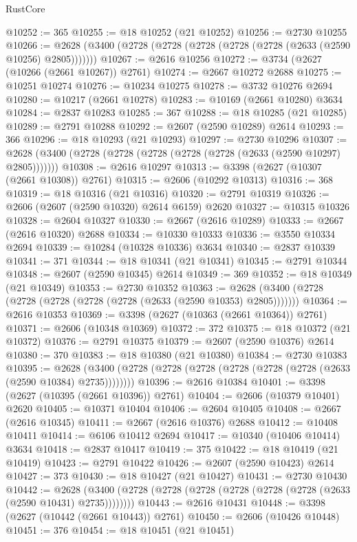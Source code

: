 \begin{lexlean}{RustCore}
\begin{coremodule}
@10252 := 365
@10255 := @18 @10252 (@21 @10252)
@10256 := @2730 @10255
@10266 := @2628 (@3400 (@2728 (@2728 (@2728 (@2728 (@2728 (@2633 (@2590 @10256) @2805)))))))
@10267 := @2616 @10256
@10272 := @3734 (@2627 (@10266 (@2661 @10267)) @2761)
@10274 := @2667 @10272 @2688
@10275 := @10251 @10274
@10276 := @10234 @10275
@10278 := @3732 @10276 @2694
@10280 := @10217 (@2661 @10278)
@10283 := @10169 (@2661 @10280) @3634
@10284 := @2837 @10283
@10285 := 367
@10288 := @18 @10285 (@21 @10285)
@10289 := @2791 @10288
@10292 := @2607 (@2590 @10289) @2614
@10293 := 366
@10296 := @18 @10293 (@21 @10293)
@10297 := @2730 @10296
@10307 := @2628 (@3400 (@2728 (@2728 (@2728 (@2728 (@2728 (@2633 (@2590 @10297) @2805)))))))
@10308 := @2616 @10297
@10313 := @3398 (@2627 (@10307 (@2661 @10308)) @2761)
@10315 := @2606 (@10292 @10313)
@10316 := 368
@10319 := @18 @10316 (@21 @10316)
@10320 := @2791 @10319
@10326 := @2606 (@2607 (@2590 @10320) @2614 @6159) @2620
@10327 := @10315 @10326
@10328 := @2604 @10327
@10330 := @2667 (@2616 @10289)
@10333 := @2667 (@2616 @10320) @2688
@10334 := @10330 @10333
@10336 := @3550 @10334 @2694
@10339 := @10284 (@10328 @10336) @3634
@10340 := @2837 @10339
@10341 := 371
@10344 := @18 @10341 (@21 @10341)
@10345 := @2791 @10344
@10348 := @2607 (@2590 @10345) @2614
@10349 := 369
@10352 := @18 @10349 (@21 @10349)
@10353 := @2730 @10352
@10363 := @2628 (@3400 (@2728 (@2728 (@2728 (@2728 (@2728 (@2633 (@2590 @10353) @2805)))))))
@10364 := @2616 @10353
@10369 := @3398 (@2627 (@10363 (@2661 @10364)) @2761)
@10371 := @2606 (@10348 @10369)
@10372 := 372
@10375 := @18 @10372 (@21 @10372)
@10376 := @2791 @10375
@10379 := @2607 (@2590 @10376) @2614
@10380 := 370
@10383 := @18 @10380 (@21 @10380)
@10384 := @2730 @10383
@10395 := @2628 (@3400 (@2728 (@2728 (@2728 (@2728 (@2728 (@2728 (@2633 (@2590 @10384) @2735))))))))
@10396 := @2616 @10384
@10401 := @3398 (@2627 (@10395 (@2661 @10396)) @2761)
@10404 := @2606 (@10379 @10401) @2620
@10405 := @10371 @10404
@10406 := @2604 @10405
@10408 := @2667 (@2616 @10345)
@10411 := @2667 (@2616 @10376) @2688
@10412 := @10408 @10411
@10414 := @6106 @10412 @2694
@10417 := @10340 (@10406 @10414) @3634
@10418 := @2837 @10417
@10419 := 375
@10422 := @18 @10419 (@21 @10419)
@10423 := @2791 @10422
@10426 := @2607 (@2590 @10423) @2614
@10427 := 373
@10430 := @18 @10427 (@21 @10427)
@10431 := @2730 @10430
@10442 := @2628 (@3400 (@2728 (@2728 (@2728 (@2728 (@2728 (@2728 (@2633 (@2590 @10431) @2735))))))))
@10443 := @2616 @10431
@10448 := @3398 (@2627 (@10442 (@2661 @10443)) @2761)
@10450 := @2606 (@10426 @10448)
@10451 := 376
@10454 := @18 @10451 (@21 @10451)

\end{coremodule}
\end{lexlean}
